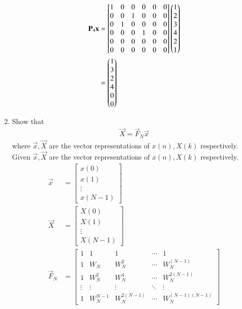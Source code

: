 \documentclass[journal,12pt,twocolumn]{IEEEtran}
\renewcommand\thesection{\arabic{section}}
\begin{document}
\begin{enumerate}[label=\arabic*.,ref=\thesection.\theenumi]
\begin{align}
		\mathbf{P}_4 \mathbf{x}&=\begin{bmatrix}
			1&0&0&0&0&0\\0&0&1&0&0&0\\0&1&0&0&0&0\\0&0&0&1&0&0\\0&0&0&0&0&0\\0&0&0&0&0&0
		\end{bmatrix}\begin{pmatrix}1\\2\\3\\4\\2\\1\end{pmatrix}\\
		&=\begin{pmatrix}1\\3\\2\\4\\0\\0\end{pmatrix}
	\end{align}
	\item Show that 
	\begin{align}
		\label{eq:dft-mat-def}
		\vec{X} = \vec{F}_N \vec{x}
	\end{align}
	where $\vec{x}, \vec{X}$ are the vector representations of $x(n), X(k)$ respectively.\\
	\solution Given $\vec{x}, \vec{X}$ are the vector representations of $x(n), X(k)$ respectively.
	\begin{align}
		\vec{x}&=\begin{bmatrix}
			x(0)\\x(1)\\\vdots\\ x(N-1)
		\end{bmatrix}\\
		\vec{X}&=\begin{bmatrix}
			X(0)\\X(1)\\ \vdots\\ X(N-1)
		\end{bmatrix}\\
		\vec{F}_N &=\begin{bmatrix}
			1&1&1&\cdots&1\\1&W_N&W^2_N&\cdots&W_N^{(N-1)}\\1&W_N^2&W_N^4&\cdots&W^{2(N-1)}_N\\\vdots&\vdots&\vdots&\ddots&\vdots\\1&W_N^{N-1}&W_N^{2(N-1)}&\cdots&W_N^{(N-1)(N-1)}
		\end{bmatrix}
	\end{align}

\end{enumerate}
\end{document}
